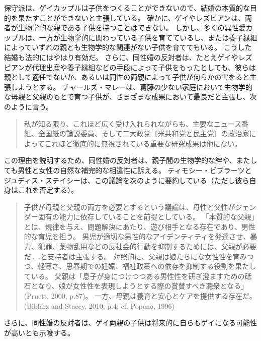 \documentclass[paper=a4,book,openany]{jlreq}
\begin{document}
保守派は、ゲイカップルは子供をつくることができないので、結婚の本質的な目的を果たすことができないと主張している。
確かに、ゲイやレズビアンは、両者が生物学的な親である子供を持つことはできない。
しかし、多くの異性愛カップルは、一方が生物学的に関わっている子供を育てているし、または養子縁組によっていずれの親とも生物学的な関連がない子供を育ててもいる。
こうした結婚も法的にはやはり有効だ。
さらに、同性婚の反対者は、たとえゲイやレズビアンが代理出産や養子縁組などの手段によって子供をもったとしても、彼らは親として適任でないか、あるいは同性の両親によって子供が何らかの害をると主張しようとする。
チャールズ・マレーは、葛藤の少ない家庭において生物学的な母親と父親のもとで育つ子供が、さまざまな成果において最良だと主張し、次のように言う。

\begin{quote}
私が知る限り、これほど広く受け入れられながらも、主要なニュース番組、全国紙の論説委員、そして二大政党〔米共和党と民主党〕の政治家によってこれほど徹底的に無視されている重要な研究成果は他にない。
\citep[p.162]{murray12:_comin_apart}
\end{quote}

この理由を説明するため、同性婚の反対者は、親子間の生物学的な絆や、またしても男性と女性の自然な補完的な相違性に訴える。
ティモシー・ビブラーツとジュディス・ステイシーは、この議論を次のように要約している（ただし彼ら自身はこれを否定する）。

\begin{quote}
子供が母親と父親の両方を必要とするという議論は、母性と父性がジェンダー固有の能力に依存していることを前提としている。
「本質的な父親」とは、規律を与え、問題解決にあたり、遊び相手となる存在であり、男性的な育児を担う。
男児が適切な男性的なアイデンティティを発達させ、暴力、犯罪、薬物乱用などの反社会的行動を抑制するためには、父親が必要だ……と支持者は主張する。
対照的に、父親は娘たちにな女性性を育みつつ、軽薄さ、思春期での妊娠、福祉政策への依存を抑制する役割を果たしている。
父親は「息子が身につけつつある男性性を研ぎ澄ますための砥石となり、娘が女性性を表現しようとする際の賞賛すべき聴衆となる」(Pruett, 2000, p.87)。
一方、母親は養育と安心とケアを提供する存在だ。
(Biblarz and Stacey, 2010, p.4; cf. Popeno, 1996)
\nocite{biblarz10:_how_does_gender_paren_matter}\nocite{pruett00:_father}\nocite{popenoe96:_life_father}

\end{quote}

さらに、同性婚の反対者は、ゲイ両親の子供は将来的に自らもゲイになる可能性が高いとも示唆する。
\end{document}
